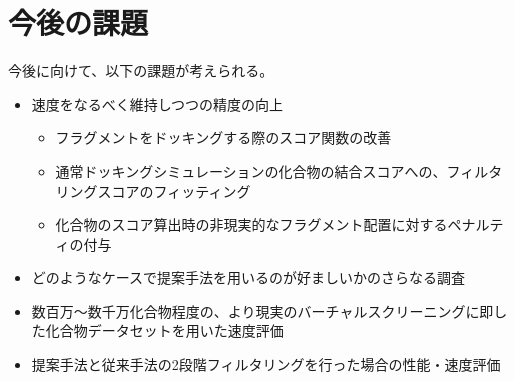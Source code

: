 \section{今後の課題}
今後に向けて、以下の課題が考えられる。
\begin{itemize}
\item 速度をなるべく維持しつつの精度の向上
	\begin{itemize}
	\item フラグメントをドッキングする際のスコア関数の改善
	\item 通常ドッキングシミュレーションの化合物の結合スコアへの、フィルタリングスコアのフィッティング
	\item 化合物のスコア算出時の非現実的なフラグメント配置に対するペナルティの付与
	\end{itemize}
\item どのようなケースで提案手法を用いるのが好ましいかのさらなる調査
\item 数百万～数千万化合物程度の、より現実のバーチャルスクリーニングに即した化合物データセットを用いた速度評価
\item 提案手法と従来手法の2段階フィルタリングを行った場合の性能・速度評価
\end{itemize}
